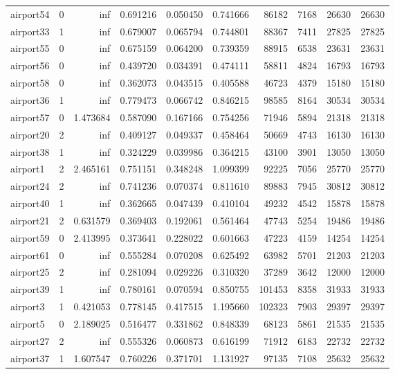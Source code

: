 \begin{longtable}{|l|r|r|r|r|r|r|r|r|r|}
airport54 & 0 & inf & 0.691216 & 0.050450 & 0.741666 & 86182 & 7168 & 26630 & 26630 \\
airport33 & 1 & inf & 0.679007 & 0.065794 & 0.744801 & 88367 & 7411 & 27825 & 27825 \\
airport55 & 0 & inf & 0.675159 & 0.064200 & 0.739359 & 88915 & 6538 & 23631 & 23631 \\
airport56 & 0 & inf & 0.439720 & 0.034391 & 0.474111 & 58811 & 4824 & 16793 & 16793 \\
airport58 & 0 & inf & 0.362073 & 0.043515 & 0.405588 & 46723 & 4379 & 15180 & 15180 \\
airport36 & 1 & inf & 0.779473 & 0.066742 & 0.846215 & 98585 & 8164 & 30534 & 30534 \\
airport57 & 0 & 1.473684 & 0.587090 & 0.167166 & 0.754256 & 71946 & 5894 & 21318 & 21318 \\
airport20 & 2 & inf & 0.409127 & 0.049337 & 0.458464 & 50669 & 4743 & 16130 & 16130 \\
airport38 & 1 & inf & 0.324229 & 0.039986 & 0.364215 & 43100 & 3901 & 13050 & 13050 \\
airport1 & 2 & 2.465161 & 0.751151 & 0.348248 & 1.099399 & 92225 & 7056 & 25770 & 25770 \\
airport24 & 2 & inf & 0.741236 & 0.070374 & 0.811610 & 89883 & 7945 & 30812 & 30812 \\
airport40 & 1 & inf & 0.362665 & 0.047439 & 0.410104 & 49232 & 4542 & 15878 & 15878 \\
airport21 & 2 & 0.631579 & 0.369403 & 0.192061 & 0.561464 & 47743 & 5254 & 19486 & 19486 \\
airport59 & 0 & 2.413995 & 0.373641 & 0.228022 & 0.601663 & 47223 & 4159 & 14254 & 14254 \\
airport61 & 0 & inf & 0.555284 & 0.070208 & 0.625492 & 63982 & 5701 & 21203 & 21203 \\
airport25 & 2 & inf & 0.281094 & 0.029226 & 0.310320 & 37289 & 3642 & 12000 & 12000 \\
airport39 & 1 & inf & 0.780161 & 0.070594 & 0.850755 & 101453 & 8358 & 31933 & 31933 \\
airport3 & 1 & 0.421053 & 0.778145 & 0.417515 & 1.195660 & 102323 & 7903 & 29397 & 29397 \\
airport5 & 0 & 2.189025 & 0.516477 & 0.331862 & 0.848339 & 68123 & 5861 & 21535 & 21535 \\
airport27 & 2 & inf & 0.555326 & 0.060873 & 0.616199 & 71912 & 6183 & 22732 & 22732 \\
airport37 & 1 & 1.607547 & 0.760226 & 0.371701 & 1.131927 & 97135 & 7108 & 25632 & 25632 \\

\end{longtable}
